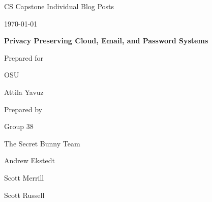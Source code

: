 
\def \CapstoneTeamName{		The Secret Bunny Team}
\def \CapstoneTeamNumber{		38}
\def \GroupMemberOne{			Andrew Ekstedt}
\def \GroupMemberTwo{			Scott Merrill}
\def \GroupMemberThree{			Scott Russell}
\def \CapstoneProjectName{		Privacy Preserving Cloud, Email, and Password Systems}
\def \CapstoneSponsorCompany{	OSU}
\def \CapstoneSponsorPerson{		Attila Yavuz}

\def \DocType{	%
                Individual Blog Posts
				}
\renewcommand{\NameSigPair}[1]{#1}


\begin{titlepage}
    \begin{singlespace}
        \hfill 
        \par\vspace{.2in}
        \centering
        \scshape{
            \huge CS Capstone \DocType \par
            {\large\today}\par
            \vspace{.5in}
            \textbf{\Huge\CapstoneProjectName}\par
            \vfill
            {\large Prepared for}\par
            \Huge \CapstoneSponsorCompany\par
            \vspace{5pt}
            {\Large\NameSigPair{\CapstoneSponsorPerson}\par}
            {\large Prepared by }\par
            Group\CapstoneTeamNumber\par
            \CapstoneTeamName\par 
            \vspace{5pt}
            {\Large
                \NameSigPair{\GroupMemberOne}\par
                \NameSigPair{\GroupMemberTwo}\par
                \NameSigPair{\GroupMemberThree}\par           
            }
            \vspace{20pt}
        }
        \begin{abstract}
        \end{abstract}     
    \end{singlespace}
\end{titlepage}

